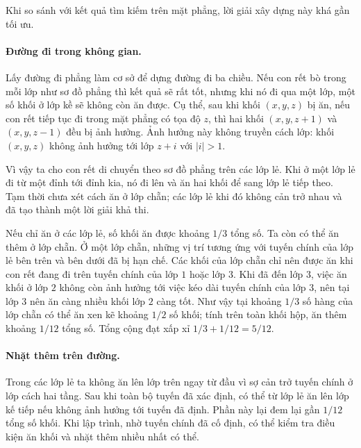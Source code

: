 \documentclass[11pt]{article}
\begin{document}
Khi so sánh với kết quả tìm kiếm trên mặt phẳng, lời giải xây dựng này khá
gần tối ưu.

\paragraph{Đường đi trong không gian.}
Lấy đường đi phẳng làm cơ sở để dựng đường đi ba chiều. Nếu con rết bò trong
mỗi lớp như sơ đồ phẳng thì kết quả sẽ rất tốt, nhưng khi nó đi qua một lớp,
một số khối ở lớp kề sẽ không còn ăn được. Cụ thể, sau khi khối $(x,y,z)$
bị ăn, nếu con rết tiếp tục đi trong mặt phẳng có tọa độ $z$, thì hai khối
$(x,y,z+1)$ và $(x,y,z-1)$ đều bị ảnh hưởng. Ảnh hưởng này không truyền cách
lớp: khối $(x,y,z)$ không ảnh hưởng tới lớp $z+i$ với $|i|>1$.

Vì vậy ta cho con rết di chuyển theo sơ đồ phẳng trên các lớp lẻ. Khi ở một
lớp lẻ đi từ một đỉnh tới đỉnh kia, nó đi lên và ăn hai khối để sang lớp lẻ
tiếp theo. Tạm thời chưa xét cách ăn ở lớp chẵn; các lớp lẻ khi đó không cản
trở nhau và đã tạo thành một lời giải khả thi.

\begin{center}
\end{center}

Nếu chỉ ăn ở các lớp lẻ, số khối ăn được khoảng $1/3$ tổng số. Ta còn có thể
ăn thêm ở lớp chẵn. Ở một lớp chẵn, những vị trí tương ứng với tuyến chính
của lớp lẻ bên trên và bên dưới đã bị hạn chế. Các khối của lớp chẵn chỉ nên
được ăn khi con rết đang đi trên tuyến chính của lớp $1$ hoặc lớp $3$. Khi đã
đến lớp $3$, việc ăn khối ở lớp $2$ không còn ảnh hưởng tới việc kéo dài
tuyến chính của lớp $3$, nên tại lớp $3$ nên ăn càng nhiều khối lớp $2$ càng
tốt. Như vậy tại khoảng $1/3$ số hàng của lớp chẵn có thể ăn xen kẽ khoảng
$1/2$ số khối; tính trên toàn khối hộp, ăn thêm khoảng $1/12$ tổng số. Tổng
cộng đạt xấp xỉ $1/3+1/12=5/12$.

\paragraph{Nhặt thêm trên đường.}
Trong các lớp lẻ ta không ăn lên lớp trên ngay từ đầu vì sợ cản trở tuyến
chính ở lớp cách hai tầng. Sau khi toàn bộ tuyến đã xác định, có thể từ lớp
lẻ ăn lên lớp kế tiếp nếu không ảnh hưởng tới tuyến đã định. Phần này lại
đem lại gần $1/12$ tổng số khối. Khi lập trình, nhờ tuyến chính đã cố định,
có thể kiểm tra điều kiện ăn khối và nhặt thêm nhiều nhất có thể.
\end{document}
